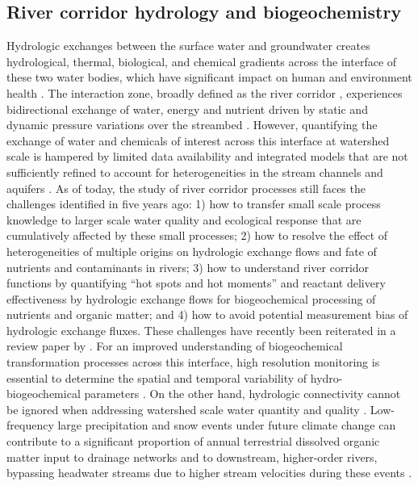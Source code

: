 \documentclass[preprint,review, 12pt]{elsarticle}
\begin{document}
\subsection{River corridor hydrology and biogeochemistry}

Hydrologic exchanges between the surface water and groundwater creates hydrological, thermal, biological, and chemical gradients across the interface of these two water bodies, which have significant impact on human and environment health \citep{Bobba2012,Conant2019}. The interaction zone, broadly defined as the river corridor \citep{Harvey2015b}, experiences bidirectional exchange of water, energy and nutrient driven by static and dynamic pressure variations over the streambed \citep{Grant2018}. However, quantifying the exchange of water and chemicals of interest across this interface at watershed scale is hampered by limited data availability and integrated models that are not sufficiently refined to account for heterogeneities in the stream channels and aquifers \citep{Barthel2016}. As of today, the study of river corridor processes still faces the challenges identified in \cite{Harvey2015b} five years ago: 1) how to transfer small scale process knowledge to larger scale water quality and ecological response that are cumulatively affected by these small processes; 2) how to resolve the effect of heterogeneities of multiple origins on hydrologic exchange flows and fate of nutrients and contaminants in rivers; 3) how to understand river corridor functions by quantifying “hot spots and hot moments” and reactant delivery effectiveness by hydrologic exchange flows for biogeochemical processing of nutrients and organic matter; and 4) how to avoid potential measurement bias of hydrologic exchange fluxes.  These challenges have recently been reiterated in a review paper by \cite{ward2019}. For an improved understanding of biogeochemical transformation processes across this interface, high resolution monitoring is essential to determine the spatial and temporal variability of hydro-biogeochemical parameters \citep{Gassen2017}. On the other hand, hydrologic connectivity cannot be ignored when addressing watershed scale water quantity and quality \citep{Freeman2007,harvey2019connectivity}. Low-frequency large precipitation and snow events under future climate change can contribute to a significant proportion of annual terrestrial dissolved organic matter input to drainage networks and to downstream, higher-order rivers, bypassing headwater streams due to higher stream velocities during these events \citep{Raymond2016}.
\end{document}

